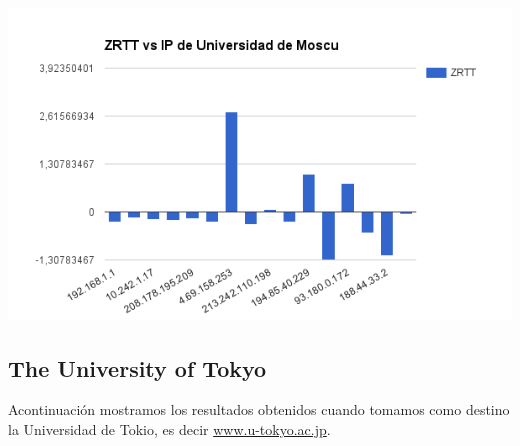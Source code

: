 \begin{center}
\includegraphics[width=\textwidth]{imgs/moscu.png}
\end{center}


\subsection{The University of Tokyo}
Acontinuación mostramos los resultados obtenidos cuando tomamos como destino la
Universidad de Tokio, es decir \url{www.u-tokyo.ac.jp}.


